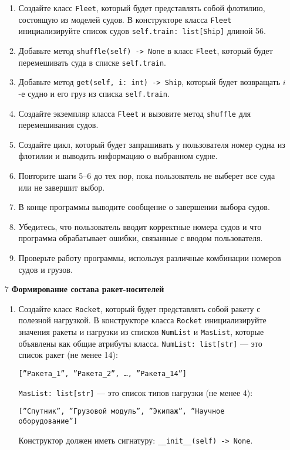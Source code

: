 \begin{enumerate}
\begin{enumerate}
    \item Создайте класс \texttt{Fleet}, который будет представлять собой флотилию, состоящую из моделей судов. В конструкторе класса \texttt{Fleet} инициализируйте список судов \texttt{self.train: list[Ship]} длиной 56.

    \item Добавьте метод \texttt{shuffle(self) -> None} в класс \texttt{Fleet}, который будет перемешивать суда в списке \texttt{self.train}.

    \item Добавьте метод \texttt{get(self, i: int) -> Ship}, который будет возвращать $i$-е судно и его груз из списка \texttt{self.train}.

    \item Создайте экземпляр класса \texttt{Fleet} и вызовите метод \texttt{shuffle} для перемешивания судов.

    \item Создайте цикл, который будет запрашивать у пользователя номер судна из флотилии и выводить информацию о выбранном судне.

    \item Повторите шаги 5–6 до тех пор, пока пользователь не выберет все суда или не завершит выбор.

    \item В конце программы выводите сообщение о завершении выбора судов.

    \item Убедитесь, что пользователь вводит корректные номера судов и что программа обрабатывает ошибки, связанные с вводом пользователя.

    \item Проверьте работу программы, используя различные комбинации номеров судов и грузов.
\end{enumerate}

\item[7] \textbf{Формирование состава ракет-носителей}
\begin{enumerate}
    \item Создайте класс \texttt{Rocket}, который будет представлять собой ракету с полезной нагрузкой. В конструкторе класса \texttt{Rocket} инициализируйте значения ракеты и нагрузки из списков \texttt{NumList} и \texttt{MasList}, которые объявлены как общие атрибуты класса. \texttt{NumList: list[str]} — это список ракет (не менее 14): 
    \begin{center}
        \texttt{[''Ракета\_1'', ''Ракета\_2'', \dots, ''Ракета\_14'']}
    \end{center}
    \texttt{MasList: list[str]} — это список типов нагрузки (не менее 4):
    \begin{center}
        \texttt{[''Спутник'', ''Грузовой модуль'', ''Экипаж'', ''Научное оборудование'']}
    \end{center}
    Конструктор должен иметь сигнатуру: \texttt{\_\_init\_\_(self) -> None}.


\end{enumerate}
\end{enumerate}
